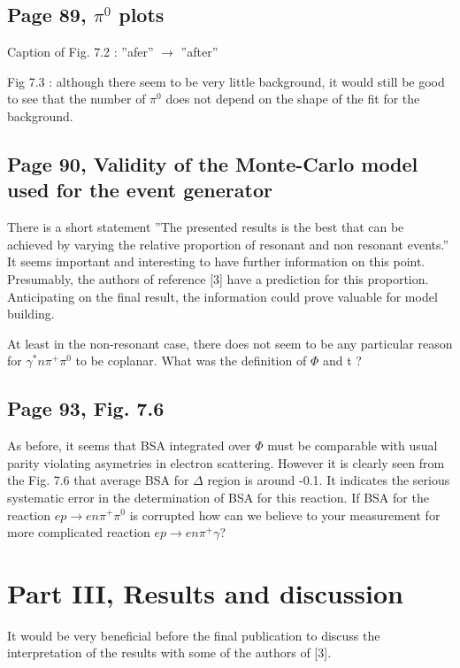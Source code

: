 \documentclass[11pt]{paper}
\begin{document}
\subsection*{Page 89, $\pi^0$ plots}

Caption of Fig. 7.2 : ''afer'' $\rightarrow$ ''after''

Fig 7.3 : although there seem to be very little background, it would still be good to see that the number of $\pi^0$ does not depend on the shape of the fit for the background.

\subsection{Page 90, Validity of the Monte-Carlo model used for the event generator}

There is a short statement ''The presented results is the best that can be achieved by varying the relative proportion of resonant and non resonant events.''
It seems important and interesting to have further information on this point.
Presumably, the authors of reference [3] have a prediction for this proportion.
Anticipating on the final result, the information could prove valuable for model building.

At least in the non-resonant case, there does not seem to be any particular reason for $\gamma^*n\pi^+\pi^0$ to be coplanar.
What was the definition of $\Phi$ and t ?

\subsection*{Page 93, Fig. 7.6}
 
As before, it seems that BSA integrated over $\Phi$ must be comparable with usual parity violating asymetries in electron scattering.
 However it is clearly seen from the Fig. 7.6 that average BSA for $\Delta$ region is around -0.1.
 It indicates  the serious systematic error in the determination of BSA for this reaction.  If BSA for the
 reaction $ep\to en\pi^+\pi^0$ is corrupted how can we believe to your measurement for
 more complicated reaction $ep\to en\pi^+\gamma$?
 
  
\section*{Part III, Results and discussion}

It would be very beneficial before the final publication to discuss the interpretation of the results with some of the authors of [3].
\end{document}
